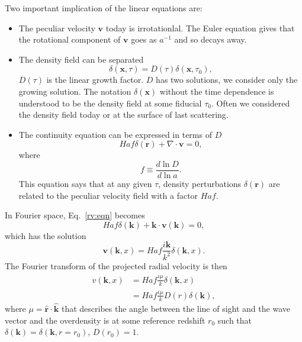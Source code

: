 \documentclass[11pt, oneside]{article}   	%
\begin{document}
Two important implication of the linear equations are:
\begin{itemize}
\item The peculiar velocity $\mathbf{v}$ today is irrotationlal. The Euler equation gives that the rotational component of $\mathbf{v}$ goes as $a^{-1}$ and so decays away.
\item The density field can be separated
\begin{equation}
\delta (\mathbf{x},\tau)  = D(\tau) \delta (\mathbf{x},\tau_0),
\end{equation}
$D(\tau)$ is  the linear growth factor.  $D$ has two solutions, we consider only the growing solution.
The notation  $\delta (\mathbf{x})$ without the time dependence is understood to be the density field at
some fiducial $\tau_0$.  Often we considered the density field today or at the surface of last scattering.
\item The continuity equation can be expressed in terms of $D$
\begin{equation}
Haf\delta(\mathbf{r}) + \nabla \cdot \mathbf{v}=0,
\label{rv:eqn}
\end{equation}
where
\begin{equation}
f \equiv \frac{d \ln{D}}{d\ln{a}}.
\label{f:eqn}
\end{equation}
This equation says that at any given $\tau$, density perturbations  $\delta(\mathbf{r})$
are related to the peculiar velocity field with a factor $Haf$.
\end{itemize}

In Fourier space, Eq.~\ref{rv:eqn} becomes
\begin{equation}
Haf\delta(\mathbf{k})  + \mathbf{k} \cdot \mathbf{v}(\mathbf{k})=0,
\end{equation}
which has the solution
\begin{equation}
 \mathbf{v}(\mathbf{k},x) = Haf \frac{i\mathbf{k}}{k^2} \delta(\mathbf{k},x).
\end{equation}
The Fourier transform of the projected radial velocity is then
\begin{align}
v(\mathbf{k},x) & = Haf \frac{i\mu}{k} \delta(\mathbf{k},x)\\
&=  Haf \frac{i\mu}{k} D(r) \delta(\mathbf{k}),
\label{dvfourier_Mpc:eqn}
\end{align}
where $\mu = \mathbf{\hat{r}} \cdot \mathbf{\hat{k}}$ that describes the angle between the line of sight and the wave vector
and the overdensity is at some reference redshift $r_0$ such that $\delta(\mathbf{k}) = \delta(\mathbf{k},r=r_0)$, $D(r_0)=1$.
\end{document}
